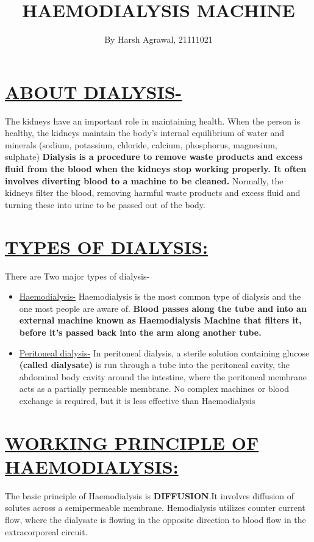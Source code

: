 \documentclass[12pt]{article}
\title{\textbf{HAEMODIALYSIS MACHINE}}
\author{By Harsh Agrawal, 21111021}
\date{}
\begin{document}
\maketitle
{}

\raggedright{\section{\underline{ABOUT DIALYSIS-}}}
The kidneys have an important role in maintaining health. When the person is healthy, the kidneys maintain the body's internal equilibrium of water and minerals (sodium, potassium, chloride, calcium, phosphorus, magnesium, sulphate)
\textbf{Dialysis is a procedure to remove waste products and excess fluid from the blood when the kidneys stop working properly. It often involves diverting blood to a machine to be cleaned.}
Normally, the kidneys filter the blood, removing harmful waste products and excess fluid and turning these into urine to be passed out of the body.

\section{\underline{TYPES OF DIALYSIS:}}
There are Two major types of dialysis-
\begin{itemize}
\item \underline{Haemodialysis-}
Haemodialysis is the most common type of dialysis and the one most people are aware of.
\textbf{Blood passes along the tube and into an external machine known as Haemodialysis Machine that filters it, before it's passed back into the arm along another tube.}
\item \underline{Peritoneal dialysis-}
In peritoneal dialysis, a sterile solution containing glucose \textbf{(called dialysate)} is run through a tube into the peritoneal cavity, the abdominal body cavity around the intestine, where the peritoneal membrane acts as a partially permeable membrane.
No complex machines or blood exchange is required, but it is less effective than Haemodialysis
\end{itemize}
\section{\underline{WORKING PRINCIPLE OF HAEMODIALYSIS:}}
The basic principle of Haemodialysis is \textbf{DIFFUSION}.It involves diffusion of solutes across a semipermeable membrane. Hemodialysis utilizes counter current flow, where the dialysate is flowing in the opposite direction to blood flow in the extracorporeal circuit.
\end{document}
